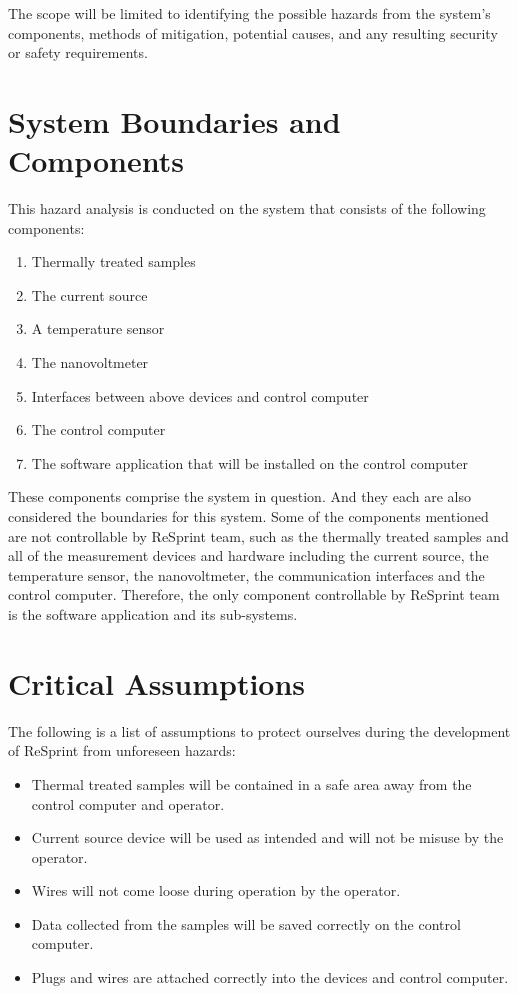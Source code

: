 \documentclass{article}
\begin{document}
\noindent The scope will be limited to identifying the possible hazards from the system's components, methods of mitigation, 
potential causes, and any resulting security or safety requirements.

\section{System Boundaries and Components}

\noindent This hazard analysis is conducted on the system that consists of the following components:

\begin{enumerate}
  \item Thermally treated samples
  \item The current source
  \item A temperature sensor
  \item The nanovoltmeter
  \item Interfaces between above devices and control computer
  \item The control computer
  \item The software application that will be installed on the control computer
\end{enumerate}

\noindent These components comprise the system in question. And they each are also considered the boundaries for this system. Some of the components mentioned are not controllable by ReSprint team, such as the thermally treated samples and all of the measurement devices and hardware including the current source, the temperature sensor, the nanovoltmeter, the communication interfaces and the control computer. Therefore, the only component controllable by ReSprint team is the software application and its sub-systems.

\section{Critical Assumptions}

\noindent The following is a list of assumptions to protect ourselves during the development of ReSprint from unforeseen hazards:

\begin{itemize}
  \item Thermal treated samples will be contained in a safe area away from the control computer and operator. 
  \item Current source device will be used as intended and will not be misuse by the operator.
  \item Wires will not come loose during operation by the operator.
  \item Data collected from the samples will be saved correctly on the control computer.
  \item Plugs and wires are attached correctly into the devices and control computer.
\end{itemize}
\end{document}
